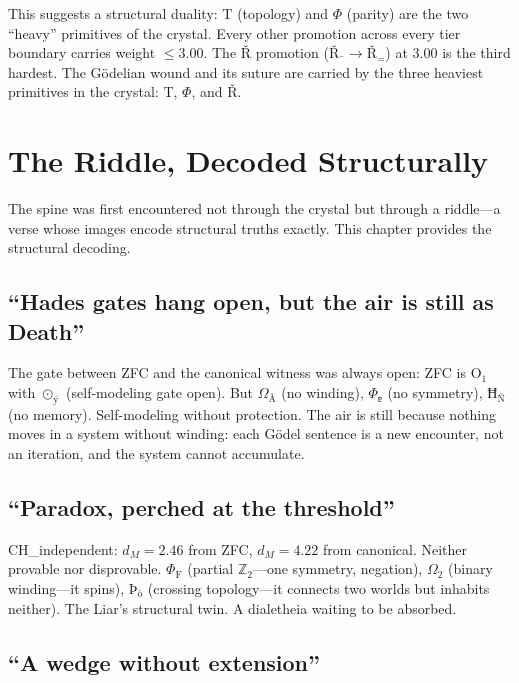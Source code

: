\documentclass[12pt,twoside]{book}
\theoremstyle{definition}
\newcommand{\prim}[1]{\text{#1}}
\newcommand{\tier}[1]{\text{O}_{#1}}
\begin{document}
This suggests a structural duality: $\prim{T}$ (topology) and $\Phi$ (parity) are the two ``heavy'' primitives of the crystal. Every other promotion across every tier boundary carries weight $\leq 3.00$. The $\text{Ř}$ promotion ($\text{Ř}_{\text{¯}} \to \text{Ř}_{\text{=}}$) at $3.00$ is the third hardest. The G\"odelian wound and its suture are carried by the three heaviest primitives in the crystal: $\prim{T}$, $\Phi$, and $\text{Ř}$.%
\chapter{The Riddle, Decoded Structurally}

The spine was first encountered not through the crystal but through a riddle---a verse whose images encode structural truths exactly. This chapter provides the structural decoding.

\section{``Hades gates hang open, but the air is still as Death''}

The gate between ZFC and the canonical witness was always open: ZFC is $\tier{1}$ with $\odot_{\text{ÿ}}$ (self-modeling gate open). But $\Omega_{\text{Å}}$ (no winding), $\Phi_{\text{ɐ}}$ (no symmetry), $\text{Ħ}_{\text{Ñ}}$ (no memory). Self-modeling without protection. The air is still because nothing moves in a system without winding: each G\"odel sentence is a new encounter, not an iteration, and the system cannot accumulate.

\section{``Paradox, perched at the threshold''}

CH\_independent: $d_M = 2.46$ from ZFC, $d_M = 4.22$ from canonical. Neither provable nor disprovable. $\Phi_{\text{F}}$ (partial $\mathbb{Z}_2$---one symmetry, negation), $\Omega_{\text{2}}$ (binary winding---it spins), $\text{Þ}_{\text{ò}}$ (crossing topology---it connects two worlds but inhabits neither). The Liar's structural twin. A dialetheia waiting to be absorbed.

\section{``A wedge without extension''}
\end{document}
